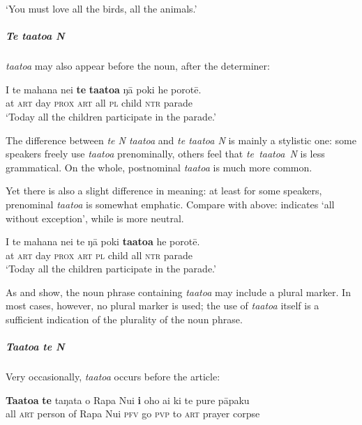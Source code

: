 \glt 
‘You must love all the birds, all the animals.’ \textstyleExampleref{[R213.053]} 
\z

\subparagraph{\textit{Te ta{\ꞌ}ato{\ꞌ}a N}} \textit{ta{\ꞌ}ato{\ꞌ}a} may also appear before the noun, after the determiner:

\ea\label{ex:4.51}
\gll {\ꞌ}I te mahana nei \textbf{te} \textbf{ta{\ꞌ}ato{\ꞌ}a} ŋā poki he porotē. \\
at \textsc{art} day \textsc{prox} \textsc{art} all \textsc{pl} child \textsc{ntr} parade \\

\glt
‘Today all the children participate in the parade.’ \textstyleExampleref{[R334.324]} 
\z

The difference between \textit{te N ta{\ꞌ}ato{\ꞌ}a} and \textit{te ta{\ꞌ}ato{\ꞌ}a N} is mainly a stylistic one: some speakers freely use \textit{ta{\ꞌ}ato{\ꞌ}a} prenominally, others feel that \textit{te~ta{\ꞌ}ato{\ꞌ}a~N} is less grammatical. On the whole, postnominal \textit{ta{\ꞌ}ato{\ꞌ}a} is much more common.

Yet there is also a slight difference in meaning: at least for some speakers, prenominal \textit{ta{\ꞌ}ato{\ꞌ}a} is somewhat emphatic. Compare  with  above:  indicates ‘all without exception’, while  is more neutral. 

\ea\label{ex:4.52}
\gll {\ꞌ}I te mahana nei te ŋā poki \textbf{ta{\ꞌ}ato{\ꞌ}a} he porotē. \\
at \textsc{art} day \textsc{prox} \textsc{art} \textsc{pl} child all \textsc{ntr} parade \\

\glt
‘Today all the children participate in the parade.’
\z

As  and  show, the noun phrase containing \textit{ta{\ꞌ}ato{\ꞌ}a} may include a plural marker. In most cases, however, no plural marker is used; the use of \textit{ta{\ꞌ}ato{\ꞌ}a} itself is a sufficient indication of the plurality of the noun phrase. 

\subparagraph{\textit{Ta{\ꞌ}ato{\ꞌ}a te N}} Very occasionally, \textit{ta{\ꞌ}ato{\ꞌ}a} occurs before the article:

\ea\label{ex:4.53}
\gll \textbf{Ta{\ꞌ}ato{\ꞌ}a} \textbf{te} taŋata o Rapa Nui \textbf{i} oho ai ki te pure pāpaku\\
all \textsc{art} person of Rapa Nui \textsc{pfv} go \textsc{pvp} to \textsc{art} prayer corpse\\

